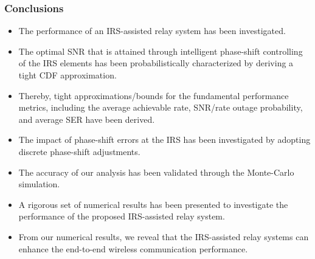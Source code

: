 \documentclass[article,mathserif,10pt,envcountsect]{beamer}
\begin{document}
\begin{frame}
	\frametitle{Conclusions}
	\begin{itemize}
		\item The performance  of an IRS-assisted relay system has been investigated.
		
		\pause
		\item The optimal SNR  that is attained through   intelligent phase-shift controlling of the IRS elements has been probabilistically characterized   by deriving a tight CDF  approximation.
		
		\pause
		\item Thereby, tight approximations/bounds for the  fundamental performance metrics, including the average achievable rate, SNR/rate outage probability,  and  average SER have been derived.
		
		\pause
		\item The impact of phase-shift errors at the IRS has been investigated by adopting discrete phase-shift adjustments.
		
		\pause
		\item The accuracy of our analysis has been validated through the Monte-Carlo simulation.
		
		\pause
		\item A rigorous set of numerical results has been presented to investigate the performance of the proposed IRS-assisted relay system.
		
		\pause
		\item From our numerical results, we  reveal that the IRS-assisted relay systems can  enhance the end-to-end wireless communication performance.
		
	\end{itemize}


\end{frame}
\end{document}
